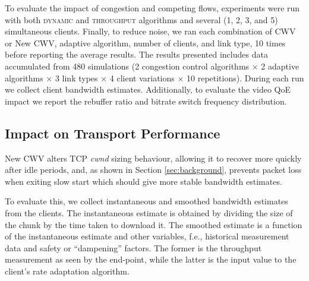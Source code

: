 \documentclass[10pt,sigconf]{acmart}
\begin{document}
To evaluate the impact of congestion and competing flows, experiments were run with both \textsc{dynamic} and \textsc{throughput} algorithms and several (1, 2, 3, and 5) simultaneous clients. Finally, to reduce noise, we ran each combination of CWV or New CWV, adaptive algorithm, number of clients, and link type, 10 times before reporting the average results. The results presented includes data accumulated from 480 simulations (2 congestion control algorithms $\times$ 2 adaptive algorithms $\times$ 3 link types $\times$ 4 client variations $\times$ 10 repetitions). 
During each run we collect client bandwidth estimates. Additionally, to evaluate the video QoE impact we report the rebuffer ratio and bitrate switch frequency distribution.

\subsection{Impact on Transport Performance} 
\label{sec:transport-impact}

New CWV alters TCP \emph{cwnd} sizing behaviour, allowing it to recover more quickly after idle periods, and, as shown in Section \ref{sec:background}, prevents packet loss when exiting slow start which should give more stable bandwidth estimates. 

To evaluate this, we collect instantaneous and smoothed bandwidth estimates from the clients. The instantaneous estimate is obtained by dividing the size of the chunk by the time taken to download it. The smoothed estimate is a function of the instantaneous estimate and other variables, f.e., historical measurement data and safety or ``dampening'' factors. The former is the throughput measurement as seen by the end-point, while the latter is the input value to the client's rate adaptation algorithm.
\end{document}
